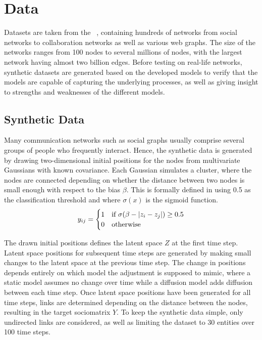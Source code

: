 \chapter{Data}\label{ch:Data}

Datasets are taken from the ~\cite{snapnets}, containing hundreds of networks from social networks to collaboration networks as well as various web graphs. The size of the networks ranges from 100 nodes to several millions of nodes, with the largest network having almost two billion edges.
Before testing on real-life networks, synthetic datasets are generated based on the developed models to verify that the models are capable of capturing the underlying processes, as well as giving insight to strengths and weaknesses of the different models. 

\section{Synthetic Data}

    Many communication networks such as social graphs usually comprise several groups of people who frequently interact. Hence, the synthetic data is generated by drawing two-dimensional initial positions for the nodes from multivariate Gaussians with known covariance. 
    Each Gaussian simulates a cluster, where the nodes are connected depending on whether the distance between two nodes is small enough with respect to the bias $\beta$. This is formally defined in  using 0.5 as the classification threshold and where $\sigma(x)$ is the sigmoid function. 
    \begin{equation}\label{eq:synth-link}
        \sub(y) = 
        \begin{cases}
            1 & \text{if } \sigma(\beta - |z_i - z_j|) \geq 0.5 \\
            0 & \text{otherwise}
        \end{cases}
    \end{equation}
    
    The drawn initial positions defines the latent space $Z$ at the first time step. Latent space positions for subsequent time steps are generated by making small changes to the latent space at the previous time step. The change in positions depends entirely on which model the adjustment is supposed to mimic, where a static model assumes no change over time while a diffusion model adds diffusion between each time step. Once latent space positions have been generated for all time steps, links are determined depending on the distance between the nodes, resulting in the target sociomatrix $Y$. To keep the synthetic data simple, only undirected links are considered, as well as limiting the dataset to 30 entities over 100 time steps.
    
